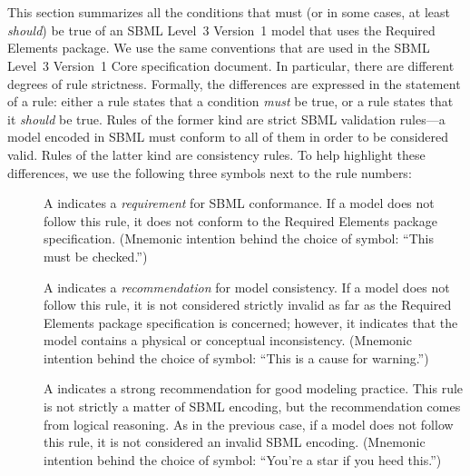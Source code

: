 
\section{}
\label{apdx-validation}
\label{validation-rules}

This section summarizes all the conditions that must (or in some cases, at least \emph{should}) be true of an SBML Level~3 Version~1 model that uses the Required Elements package.  We use the same conventions that are used in the SBML Level~3 Version~1 Core specification document.  In particular, there are different degrees of rule strictness.  Formally, the differences are expressed in the statement of a rule: either a rule states that a condition \emph{must} be true, or a rule states that it \emph{should} be true.  Rules of the former kind are strict SBML validation rules---a model encoded in SBML must conform to all of them in order to be considered valid.  Rules of the latter kind are consistency rules.  To help highlight these differences, we use the following three symbols next to the rule numbers:

\begin{description}

\item[\hspace*{6.5pt}\vSymbol\vsp] A \vSymbolName indicates a \emph{requirement} for SBML conformance. If a model does not follow this rule, it does not conform to the Required Elements package specification.  (Mnemonic intention behind the choice of symbol: ``This must be checked.'')

\item[\hspace*{6.5pt}\cSymbol\csp] A \cSymbolName indicates a \emph{recommendation} for model consistency.  If a model does not follow this rule, it is not considered strictly invalid as far as the Required Elements package specification is concerned; however, it indicates that the model contains a physical or conceptual inconsistency.  (Mnemonic intention behind the choice of symbol: ``This is a cause for warning.'')

\item[\hspace*{6.5pt}\mSymbol\msp] A \mSymbolName indicates a strong recommendation for good modeling practice.  This rule is not strictly a matter of SBML encoding, but the recommendation comes from logical reasoning.  As in the previous case, if a model does not follow this rule, it is not considered an invalid SBML encoding.  (Mnemonic intention behind the choice of symbol: ``You're a star if you heed this.'')

\end{description}


